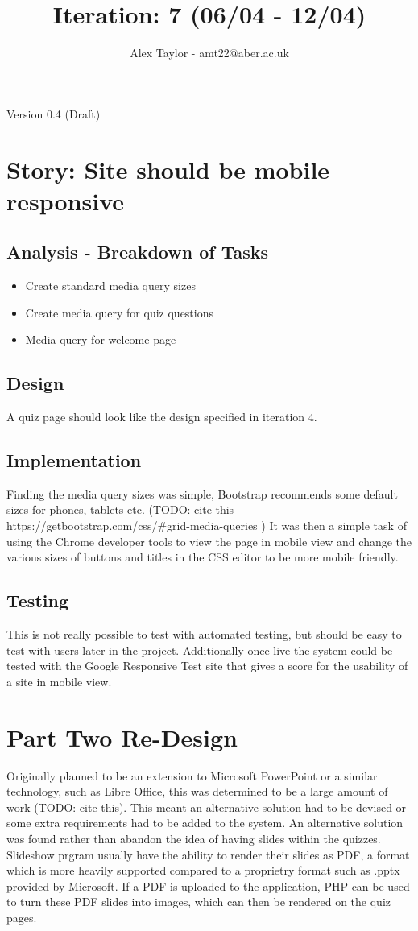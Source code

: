 \documentclass{article}
\title{Iteration: 7 (06/04 - 12/04)}
\author{Alex Taylor - amt22@aber.ac.uk}
\begin{document}
\maketitle
\begin{center}
	Version 0.4 (Draft)
\end{center}
\tableofcontents
\thispagestyle{empty}
\newpage

\section{Story: Site should be mobile responsive}
\subsection{Analysis - Breakdown of Tasks}
\begin{itemize}
	\item Create standard media query sizes
	\item Create media query for quiz questions
	\item Media query for welcome page
\end{itemize}
\subsection{Design}
A quiz page should look like the design specified in iteration 4.
\subsection{Implementation}
Finding the media query sizes was simple, Bootstrap recommends some default sizes for phones, tablets etc. (TODO: cite this https://getbootstrap.com/css/\#grid-media-queries ) It was then a simple task of using the Chrome developer tools to view the page in mobile view and change the various sizes of buttons and titles in the CSS editor to be more mobile friendly.
\subsection{Testing}
This is not really possible to test with automated testing, but should be easy to test with users later in the project. Additionally once live the system could be tested with the Google Responsive Test site that gives a score for the usability of a site in mobile view.
\newpage

\section{Part Two Re-Design}
Originally planned to be an extension to Microsoft PowerPoint or a similar technology, such as Libre Office, this was determined to be a large amount of work (TODO: cite this). This meant an alternative solution had to be devised or some extra requirements had to be added to the system. An alternative solution was found rather than abandon the idea of having slides within the quizzes. Slideshow prgram usually have the ability to render their slides as PDF, a format which is more heavily supported compared to a proprietry format such as .pptx provided by Microsoft. If a PDF is uploaded to the application, PHP can be used to turn these PDF slides into images, which can then be rendered on the quiz pages.
\end{document}
